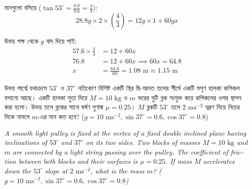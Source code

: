 \documentclass[12pt, a4paper]{article}
\begin{document}
{{\begin{tcolorbox}[solutionbox={সমাধান (Solution)}]
    মানগুলো বসিয়ে ($\tan 53^\circ = \frac{0.8}{0.6} = \frac{4}{3}$):
    \[ 28.8 g \times 2 \times \left(\frac{4}{3}\right) = 12 g \times 1 + 60 g x \]
    
    উভয় পক্ষ থেকে $g$ বাদ দিয়ে পাই:
    \begin{align*}
        57.6 \times \frac{4}{3} &= 12 + 60 x \\
        76.8 &= 12 + 60 x \implies 60 x = 64.8 \\
        x &= \frac{64.8}{60} = 1.08\text{ m} \approx \mathbf{1.15}\text{ m}
    \end{align*}
\end{tcolorbox}
\newpage

\begin{tcolorbox}[questionbox={প্রশ্ন (Question) 47}]
    \noindent
    উভয় পার্শ্বে যথাক্রমে $53^\circ$ ও $37^\circ$ নতিকোণ বিশিষ্ট একটি স্থির দ্বি-আনত তলের শীর্ষে একটি মসৃণ হালকা কপিকল বসানো আছে। একটি হালকা সুতা দিয়ে $M = 10\text{ kg}$ ও $m$ ভরের দুটি ব্লক সংযুক্ত করে কপিকলের ওপর স্থাপন করা হলো। উভয় তলে ব্লকের সাথে ঘর্ষণ গুণাঙ্ক $\mu = 0.25$। $M$ ব্লকটি $53^\circ$ তলে $2\text{ ms}^{-2}$ ত্বরণ নিয়ে নিচের দিকে নামলে $m$-এর মান কত হবে? ($g = 10\text{ ms}^{-2}, \sin 37^\circ = 0.6, \cos 37^\circ = 0.8$)
    
    \vspace{0.8em}
    \begin{english}
    \noindent\textit{\color{darkgray}
    A smooth light pulley is fixed at the vertex of a fixed double inclined plane having inclinations of $53^\circ$ and $37^\circ$ on its two sides. Two blocks of masses $M = 10\text{ kg}$ and $m$ are connected by a light string passing over the pulley. The coefficient of friction between both blocks and their surfaces is $\mu = 0.25$. If mass $M$ accelerates down the $53^\circ$ slope at $2\text{ ms}^{-2}$, what is the mass $m$? ($g = 10\text{ ms}^{-2}, \sin 37^\circ = 0.6, \cos 37^\circ = 0.8$)
    }
    \end{english}
\end{tcolorbox}

\vspace{1em}
\begin{center}
\end{center}}}
\end{document}
